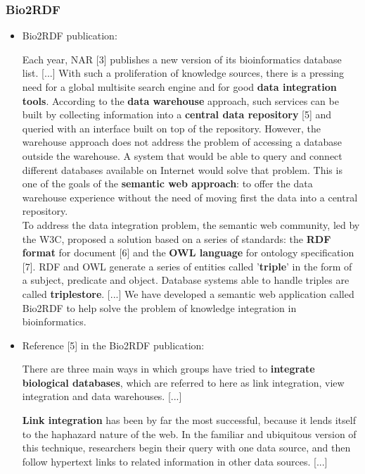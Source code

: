\documentclass{article}
\begin{document}
\subsubsection{Bio2RDF}

\begin{itemize}

\item Bio2RDF publication:
\begin{displayquote}
Each year, NAR [3] publishes a new version of its bioinformatics database list. [...] With such a proliferation of knowledge sources, there is a pressing need for a global multisite search engine and for good \textbf{data integration tools}. According to the \textbf{data warehouse} approach, such services can be built by collecting information into a \textbf{central data repository} [5] and queried with an interface built on top of the repository. However, the warehouse approach does not address the problem of accessing a database outside the warehouse. A system that would be able to query and connect different databases available on Internet would solve that problem. This is one of the goals of the \textbf{semantic web approach}: to offer the data warehouse experience without the need of moving first the data into a central repository.\\
To address the data integration problem, the semantic web community, led by the W3C, proposed a solution based on a series of standards: the \textbf{RDF format} for document [6] and the \textbf{OWL language} for ontology specification [7]. RDF and OWL generate a series of entities called ’\textbf{triple}’ in the form of a subject, predicate and object. Database systems able to handle triples are called \textbf{triplestore}. [...] We have developed a semantic web application called Bio2RDF to help solve the problem of knowledge integration in bioinformatics.
\end{displayquote}


\item Reference [5] in the Bio2RDF publication:
\begin{displayquote}
There are three main ways in which groups have tried to \textbf{integrate biological databases}, which are referred to here as link integration, view integration and data warehouses.
[...]

\textbf{Link integration} has been by far the most successful, because it lends itself to the haphazard nature of the web. In the familiar and ubiquitous version of this technique, researchers begin their query with one data source, and then follow hypertext links to related information in other data sources.
[...]


\end{displayquote}
\end{itemize}
\end{document}
